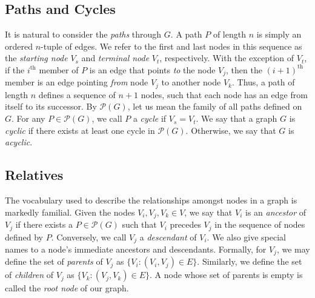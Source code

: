 \documentclass[12pt,twoside]{reedthesis}
\begin{document}
	\subsection*{Paths and Cycles}
	It is natural to consider the {\em paths} through $G$. A path $P$ of length $n$ is simply an ordered $n$-tuple of edges. 
	We refer to the first and last nodes in this sequence as the {\em starting node} $V_s$ and {\em terminal node} $V_t$, respectively. 
	 With the exception of $V_t$, if the $i^{\text{th}}$ member of $P$ is an edge that points {\em to} the node $V_j$, then the $(i+1)^{\text{th}}$ member is an edge pointing {\em from} node $V_j$ to another node $V_k$. 
	 Thus, a path of length $n$ defines a sequence of $n+1$ nodes, such that each node has an edge from itself to its successor. 
	 By $\mathcal{P}(G)$, let us mean the family of all paths defined on $G$. For any $P \in \mathcal{P}(G)$, we call $P$ a {\em cycle} if $V_s = V_t$. We say that a graph $G$ is {\em cyclic} if there exists at least one cycle in $\mathcal{P}(G)$. Otherwise, we say that $G$ is {\em acyclic}.
	
	\subsection*{Relatives}
	The vocabulary used to describe the relationships amongst nodes in a graph is markedly familial. Given the nodes $V_i, V_j, V_k \in V$, we say that $V_i$ is an {\em ancestor} of $V_j$ if there exists a $P \in \mathcal{P}(G)$ such that $V_i$ precedes $V_j$ in the sequence of nodes defined by $P$. Conversely, we call $V_j$ a {\em descendant} of $V_i$. We also give special names to a node's immediate ancestors and descendants. Formally, for $V_j$, we may define the set of {\em parents} of $V_j$ as $\{V_i : (V_i,V_j) \in E \}$. Similarly, we define the set of {\em children} of $V_j$ as $\{V_k : (V_j, V_k) \in E\}$. A node whose set of parents is empty is called the {\em root node} of our graph.
	
\end{document}
